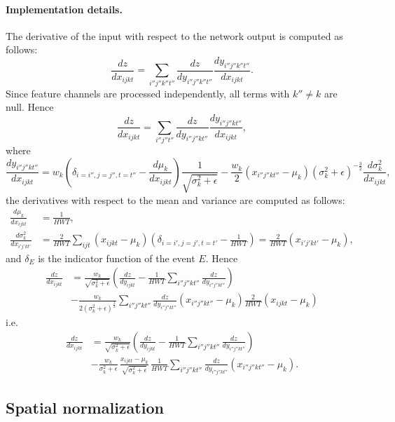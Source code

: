 \documentclass[12pt]{article}
\begin{document}
\paragraph{Implementation details.} The derivative of the input with respect to the network output is computed as follows:
\[
\frac{dz}{dx_{ijkt}} = \sum_{i''j''k''t''}
\frac{dz}{d y_{i''j''k''t''}} 
\frac{d y_{i''j''k''t''}}{d x_{ijkt}}.
\]
Since feature channels are processed independently, all terms with $k''\not=k$ are null. Hence
\[
\frac{dz}{dx_{ijkt}} = \sum_{i''j''t''}
\frac{dz}{d y_{i''j''kt''}} 
\frac{d y_{i''j''kt''}}{d x_{ijkt}},
\]
where
\[
\frac{d y_{i''j''kt''}}{d x_{ijkt}} 
=
w_k
\left(\delta_{i=i'',j=j'',t=t''} - \frac{d \mu_k}{d x_{ijkt}}\right)
\frac{1}{\sqrt{\sigma^2_k + \epsilon}}
-
\frac{w_k}{2}
\left(x_{i''j''kt''} - \mu_k\right)
\left(\sigma_k^2 + \epsilon \right)^{-\frac{3}{2}}
\frac{d \sigma_k^2}{d x_{ijkt}},
\]
the derivatives with respect to the mean and variance are computed as follows:
\begin{align*}
\frac{d \mu_k}{d x_{ijkt}} &= \frac{1}{HWT},
\\
\frac{d \sigma_k^2}{d x_{i'j'kt'}}
&=
\frac{2}{HWT}
\sum_{ijt}
\left(x_{ijkt} - \mu_k \right)
\left(\delta_{i=i',j=j',t=t'} - \frac{1}{HWT} \right)
=
\frac{2}{HWT} \left(x_{i'j'kt'} - \mu_k \right),
\end{align*}
and $\delta_E$ is the indicator function of the event $E$. Hence
\begin{align*}
\frac{dz}{dx_{ijkt}}
&=
\frac{w_k}{\sqrt{\sigma^2_k + \epsilon}}
\left(
\frac{dz}{d y_{ijkt}} 
-
\frac{1}{HWT}\sum_{i''j''kt''}
\frac{dz}{d y_{i''j''kt''}} 
\right)
\\
&-
\frac{w_k}{2(\sigma^2_k + \epsilon)^{\frac{3}{2}}}
\sum_{i''j''kt''}
\frac{dz}{d y_{i''j''kt''}} 
\left(x_{i''j''kt''} - \mu_k\right)
\frac{2}{HWT} \left(x_{ijkt} - \mu_k \right)
\end{align*}
i.e.
\begin{align*}
\frac{dz}{dx_{ijkt}}
&=
\frac{w_k}{\sqrt{\sigma^2_k + \epsilon}}
\left(
\frac{dz}{d y_{ijkt}} 
-
\frac{1}{HWT}\sum_{i''j''kt''}
\frac{dz}{d y_{i''j''kt''}} 
\right)
\\
&-
\frac{w_k}{\sigma^2_k + \epsilon}
\,
\frac{x_{ijkt} - \mu_k}{\sqrt{\sigma^2_k + \epsilon}}
\,
\frac{1}{HWT}
\sum_{i''j''kt''}
\frac{dz}{d y_{i''j''kt''}} 
\left(x_{i''j''kt''} - \mu_k\right).
\end{align*}

\subsection{Spatial normalization}\label{s:spnorm}
\end{document}
